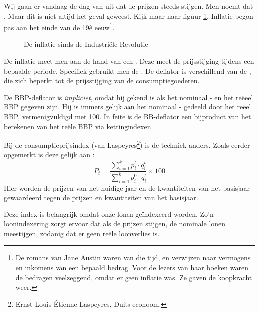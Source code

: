 Wij gaan er vandaag de dag van uit dat de prijzen steeds stijgen. Men noemt dat . Maar dit is niet altijd het geval geweest. Kijk maar naar figuur \ref{fig:h5inflatie}. Inflatie begon pas aan het einde van de 19\^{e} eeuw\footnote{De romans van Jane Austin waren van die tijd, en verwijzen naar vermogens en inkomens van een bepaald bedrag. Voor de lezers van haar boeken waren de bedragen veelzeggend, omdat er geen inflatie was. Ze gaven de koopkracht weer.}.

\begin{figure}[H]
\small\centering\captionsetup{justification=centering,margin=2cm}
\caption{De inflatie sinds de Industri\"ele Revolutie}
\label{fig:h5inflatie}
\end{figure}

De inflatie meet men aan de hand van een . Deze meet de prijsstijging tijdens een bepaalde periode. Specifiek gebruikt men de . De deflator is verschillend van de , die zich beperkt tot de prijsstijging van de consumptiegoederen.
\par De BBP-deflator is \textit{impliciet}, omdat hij gekend is als het nominaal - en het re\"eeel BBP gegeven zijn. Hij is immers gelijk aan het nominaal - gedeeld door het re\"eel BBP, vermenigvuldigd met 100. In feite is de BB-deflator een bijproduct van het berekenen van het re\"ele BBP via kettingindexen.\\

\par\noindent Bij de consumptieprijsindex (van Laspeyres\footnote{Ernst Louis \'Etienne Laspeyres, Duits econoom.}) is de techniek anders. Zoals eerder opgemerkt is deze gelijk aan :
$$P_t=\frac{\sum_{i=1}^k p_i^{t}\cdot q_i^{t}}{\sum_{i=1}^k p_i^{0}\cdot q_i^{t}}\times 100$$
Hier worden de prijzen van het huidige jaar en de kwantiteiten van het basisjaar gewaardeerd tegen de prijzen en kwantiteiten van het basisjaar.
\par Deze index is belangrijk omdat onze lonen ge\"indexeerd worden. Zo'n loonindexering zorgt ervoor dat als de prijzen stijgen, de nominale lonen meestijgen, zodanig dat er geen re\"ele loonverlies is.\\

